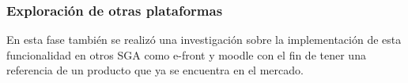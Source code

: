 \subsubsection{Exploración de otras plataformas}

En esta fase también se realizó una investigación sobre la implementación de esta funcionalidad en otros SGA como e-front y moodle con el fin de tener una referencia de un producto que ya se encuentra en el mercado.







